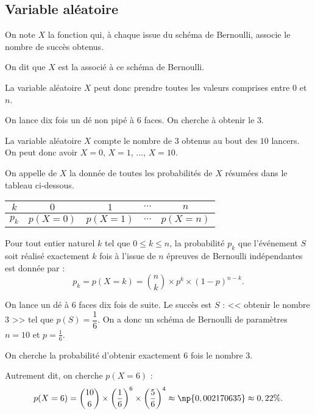 \documentclass[10pt,openright,twoside,french]{book}
\begin{document}
\subsection{Variable aléatoire}

\begin{Defi}
    On note $X$ la fonction qui, à chaque issue du schéma de Bernoulli, associe le nombre de succès obtenus.\par
    On dit que $X$ est la  associé à ce schéma de Bernoulli.
\end{Defi}

\begin{Rmq}
    La variable aléatoire $X$ peut donc prendre toutes les valeurs comprises entre $0$ et $n$.
\end{Rmq}

\begin{Exemple}
    On lance dix fois un dé non pipé à $6$ faces. On cherche à obtenir le $3$.\par
    La variable aléatoire $X$ compte le nombre de $3$ obtenus au bout des $10$ lancers. On peut donc avoir $X = 0$, $X = 1$, $\ldots$, $X = 10$.
\end{Exemple}

\begin{Defi}
    On appelle  de $X$ la donnée de toutes les probabilités de $X$ résumées dans le tableau ci-dessous.
    \begin{center}
        \begin{tabular}{|*{5}{c|}}
            \hline
                $k$ & $0$ & $1$ & $\cdots$ & $n$ \\
            \hline
                $p_k$ & $p(X = 0)$ & $p(X = 1)$ & $\cdots$ & $p(X = n)$ \\
            \hline
        \end{tabular}
    \end{center}
\end{Defi}

\begin{Prop}
    Pour tout entier naturel $k$ tel que $0 \leq k \leq n$, la probabilité $p_k$ que l'événement $S$ soit réalisé exactement $k$ fois à l'issue de $n$ épreuves de Bernoulli indépendantes est donnée par :
    \[p_k = p(X = k) = \binom n k \times p^k \times (1-p)^{n - k}.\]
\end{Prop}

\begin{Exemple}
    On lance un dé à $6$ faces dix fois de suite. Le succès est $S$ : << obtenir le nombre $3$ >> tel que $p(S) = \dfrac 16$. On a donc un schéma de Bernoulli de paramètres $n = 10$ et $p = \frac 1 6$.\par
    On cherche la probabilité d'obtenir exactement $6$ fois le nombre $3$.\par Autrement dit, on cherche $p(X = 6)$ :
    \[p(X = 6) = \binom{10}{6} \times \left(\dfrac 1 6\right)^6 \times \left(\dfrac 5 6\right)^4 \approx \np{0,002170635} \approx 0,22\%.\]
\end{Exemple}
\end{document}
